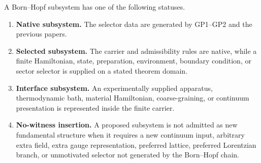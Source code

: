 \documentclass[12pt,a4paper]{article}
\begin{document}
\begin{definition}
\label{p12:def:subsystem-status-classes}
A Born--Hopf subsystem has one of the following statuses.

\begin{enumerate}[label=(\roman*), leftmargin=2em]
\item \textbf{Native subsystem.}
The selector data are generated by GP1--GP2 and the previous papers.

\item \textbf{Selected subsystem.}
The carrier and admissibility rules are native, while a finite Hamiltonian, state, preparation, environment, boundary condition, or sector selector is supplied on a stated theorem domain.

\item \textbf{Interface subsystem.}
An experimentally supplied apparatus, thermodynamic bath, material Hamiltonian, coarse-graining, or continuum presentation is represented inside the finite carrier.

\item \textbf{No-witness insertion.}
A proposed subsystem is not admitted as new fundamental structure when it requires a new continuum input, arbitrary extra field, extra gauge representation, preferred lattice, preferred Lorentzian branch, or unmotivated selector not generated by the Born--Hopf chain.
\end{enumerate}
\end{definition}
\end{document}
